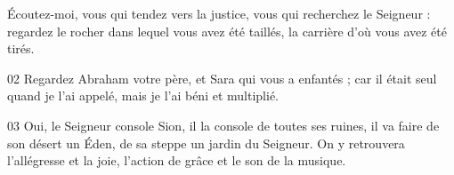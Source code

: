 Écoutez-moi, vous qui tendez vers la justice, vous qui recherchez le Seigneur : regardez le rocher dans lequel vous avez été taillés, la carrière d’où vous avez été tirés.

02 Regardez Abraham votre père, et Sara qui vous a enfantés ; car il était seul quand je l’ai appelé, mais je l’ai béni et multiplié.

03 Oui, le Seigneur console Sion, il la console de toutes ses ruines, il va faire de son désert un Éden, de sa steppe un jardin du Seigneur. On y retrouvera l’allégresse et la joie, l’action de grâce et le son de la musique.
